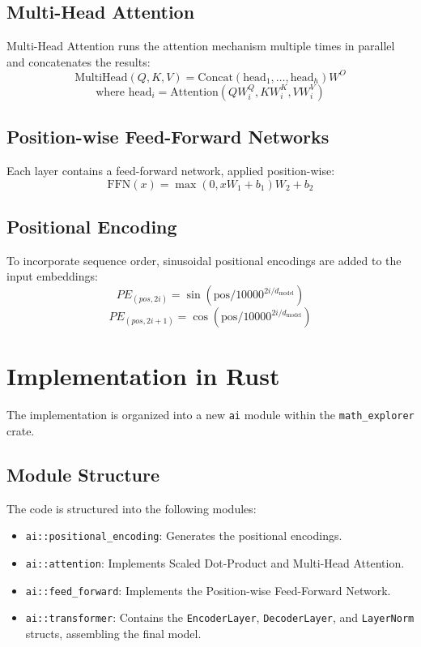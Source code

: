 \documentclass{article}
\begin{document}
\subsection{Multi-Head Attention}
Multi-Head Attention runs the attention mechanism multiple times in parallel and concatenates the results:
\[ \text{MultiHead}(Q, K, V) = \text{Concat}(\text{head}_1, \dots, \text{head}_h)W^O \]
\[ \text{where head}_i = \text{Attention}(QW_i^Q, KW_i^K, VW_i^V) \]

\subsection{Position-wise Feed-Forward Networks}
Each layer contains a feed-forward network, applied position-wise:
\[ \text{FFN}(x) = \max(0, xW_1 + b_1)W_2 + b_2 \]

\subsection{Positional Encoding}
To incorporate sequence order, sinusoidal positional encodings are added to the input embeddings:
\[ PE_{(pos, 2i)} = \sin(\text{pos} / 10000^{2i/d_{\text{model}}}) \]
\[ PE_{(pos, 2i+1)} = \cos(\text{pos} / 10000^{2i/d_{\text{model}}}) \]

\section{Implementation in Rust}
The implementation is organized into a new \texttt{ai} module within the \texttt{math_explorer} crate.

\subsection{Module Structure}
The code is structured into the following modules:
\begin{itemize}
    \item \texttt{ai::positional\_encoding}: Generates the positional encodings.
    \item \texttt{ai::attention}: Implements Scaled Dot-Product and Multi-Head Attention.
    \item \texttt{ai::feed\_forward}: Implements the Position-wise Feed-Forward Network.
    \item \texttt{ai::transformer}: Contains the \texttt{EncoderLayer}, \texttt{DecoderLayer}, and \texttt{LayerNorm} structs, assembling the final model.
\end{itemize}
\end{document}
